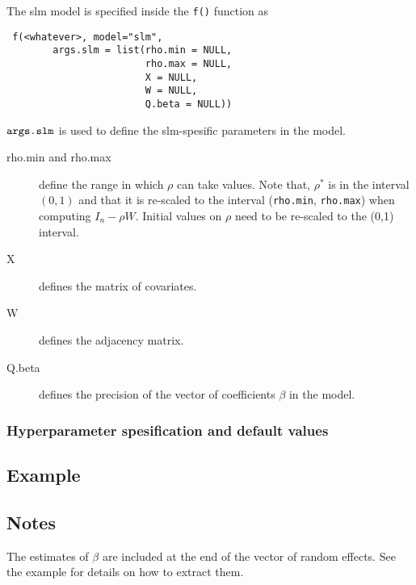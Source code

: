 \documentclass[a4paper,11pt]{article}
\begin{document}
The slm model is specified inside the {\tt f()} function as
\begin{verbatim}
 f(<whatever>, model="slm",
        args.slm = list(rho.min = NULL,
                        rho.max = NULL,
                        X = NULL,
                        W = NULL,
                        Q.beta = NULL))
\end{verbatim}
$\verb|args.slm|$ is used to define the slm-spesific parameters in the
model.
\begin{description}
\item[rho.min and rho.max] define the range in which $\rho$ can take
    values. Note that, $\rho^{*}$ is in the interval $(0,1)$ and that
    it is re-scaled to the interval (\verb|rho.min|, \verb|rho.max|)
    when computing $I_n-\rho W$.  Initial values on $\rho$ need to be
    re-scaled to the (0,1) interval.
\item[X] defines the matrix of covariates.
\item[W] defines the adjacency matrix.
\item[Q.beta] defines the precision of the vector of coefficients
    $\beta$ in the model.
\end{description}

\subsubsection*{Hyperparameter spesification and default values}



\subsection*{Example}

{\small}



\subsection*{Notes}

The estimates of $\beta$ are included at the end of the vector of random
effects. See the example for details on how to extract them.
\end{document}
